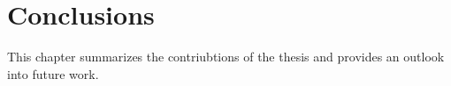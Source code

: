 \chapter{Conclusions\label{cha:chapter6}}

This chapter summarizes the contriubtions of the thesis and provides an outlook into future work. 